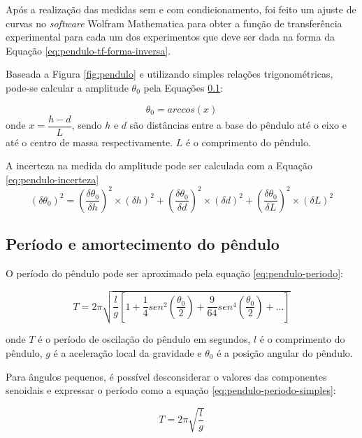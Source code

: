 \documentclass[a4paper]{instrumentacao}
\begin{document}
Após a realização das medidas sem e com condicionamento, foi feito um ajuste de curvas no \textit{software} Wolfram Mathematica para obter a função de transferência experimental para cada um dos experimentos que deve ser dada na forma da Equação \ref{eq:pendulo-tf-forma-inversa}.

Baseada  a Figura \ref{fig:pendulo} e  utilizando simples relações trigonométricas, pode-se calcular a amplitude $\theta_{0}$ pela Equações \ref{}:

\begin{equation}
	\theta_{0} = arccos(x)
	\label{eq:pendulo-angulo0}
\end{equation}
\noindent onde $x = \dfrac{h-d}{L}$, sendo $h$ e $d$ são distâncias entre a base do pêndulo até o eixo e até o centro de massa respectivamente. $L$ é o comprimento do pêndulo.

A incerteza na medida do amplitude pode ser calculada com a Equação \ref{eq:pendulo-incerteza}
\begin{equation}
	(\delta\theta_{0})^2 = (\dfrac{\delta\theta_{0}}{\delta h})^2 \times (\delta h)^2 + (\dfrac{\delta\theta_{0}}{\delta d})^2 \times (\delta d)^2 + (\dfrac{\delta\theta_{0}}{\delta L})^2 \times (\delta L)^2
	\label{eq:pendulo-incerteza}
\end{equation}


\subsection{Período e amortecimento do pêndulo}

O período do pêndulo pode ser aproximado pela equação \ref{eq:pendulo-periodo}:

\begin{equation}
	T = 2 \pi \sqrt{\frac{l}{g} \left[1 + \frac{1}{4} sen^2\left(\frac{\theta_0}{2}\right) + \frac{9}{64} sen^4\left(\frac{\theta_0}{2}\right) + ...\right]}
	\label{eq:pendulo-periodo}
\end{equation}

\noindent onde $T$ é o período de oscilação do pêndulo em segundos, $l$ é o comprimento do pêndulo, $g$ é a aceleração local da gravidade e $\theta_0$ é a posição angular do pêndulo.

Para ângulos pequenos, é possível desconsiderar o valores das componentes senoidais e expressar o período como a equação \ref{eq:pendulo-periodo-simples}:

\begin{equation}
	T = 2 \pi \sqrt{\frac{l}{g}}
	\label{eq:pendulo-periodo-simples}
\end{equation}
\end{document}

